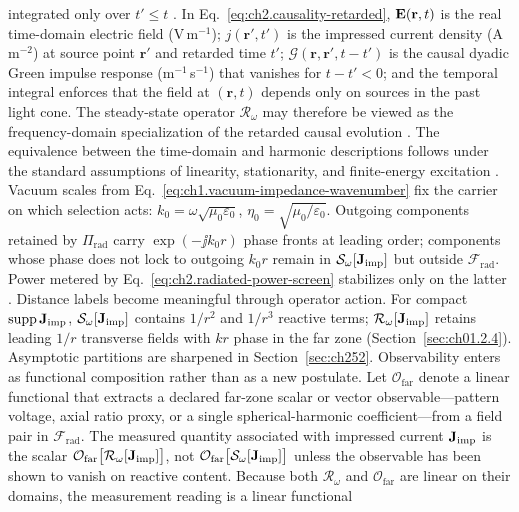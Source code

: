 integrated only over \(t'\le t\) \cite{stratton1941}.
In Eq.~\eqref{eq:ch2.causality-retarded},
\(\mathbf{E}(\mathbf{r},t)\) is the real time-domain electric field (V\,m\(^{-1}\));
\(j(\mathbf{r}',t')\) is the impressed current density (A\,m\(^{-2}\)) at source
point \(\mathbf{r}'\) and retarded time \(t'\);
\(\mathcal{G}(\mathbf{r},\mathbf{r}',t-t')\) is the causal dyadic Green impulse
response (m\(^{-1}\)\,s\(^{-1}\)) that vanishes for \(t-t'<0\); and the temporal
integral enforces that the field at \((\mathbf{r},t)\) depends only on sources in
the past light cone.
The steady-state operator
$\mathcal{R}_\omega$ may therefore be viewed as the frequency-domain specialization of
the retarded causal evolution \cite{stratton1941}. The equivalence between
the time-domain and harmonic descriptions follows under the standard assumptions of
linearity, stationarity, and finite-energy excitation \cite{maxwell1873}.
Vacuum scales from Eq.~\eqref{eq:ch1.vacuum-impedance-wavenumber} fix the carrier
on which selection acts: \(k_0=\omega\sqrt{\mu_0\varepsilon_0}\),
\(\eta_0=\sqrt{\mu_0/\varepsilon_0}\). Outgoing components retained by
\(\Pi_{\mathrm{rad}}\) carry \(\exp(-\jj k_0 r)\) phase fronts at leading order;
components whose phase does not lock to outgoing \(k_0 r\) remain in
\(\mathcal{S}_\omega[\mathbf{J}_{\mathrm{imp}}]\) but outside \(\mathcal{F}_{\mathrm{rad}}\). Power
metered by Eq.~\eqref{eq:ch2.radiated-power-screen} stabilizes only on the latter
\cite{stratton1941}. Distance labels become meaningful through operator action. For compact
\(\operatorname{supp}\mathbf{J}_{\mathrm{imp}}\), \(\mathcal{S}_\omega[\mathbf{J}_{\mathrm{imp}}]\) contains
\(1/r^{2}\) and \(1/r^{3}\) reactive terms; \(\mathcal{R}_\omega[\mathbf{J}_{\mathrm{imp}}]\) retains
leading \(1/r\) transverse fields with \(kr\) phase in the far zone
(Section~\ref{sec:ch01.2.4}). Asymptotic partitions are sharpened in
Section~\ref{sec:ch252}.
Observability enters as functional composition rather than as a new postulate.
Let \(\mathcal{O}_{\mathrm{far}}\) denote a linear functional that extracts a
declared far-zone scalar or vector observable---pattern voltage, axial ratio
proxy, or a single spherical-harmonic coefficient---from a field pair in
\(\mathcal{F}_{\mathrm{rad}}\). The measured quantity associated with impressed current \(\mathbf{J}_{\mathrm{imp}}\) is the scalar
\(\mathcal{O}_{\mathrm{far}}\big[\mathcal{R}_\omega[\mathbf{J}_{\mathrm{imp}}]\big]\), not
\(\mathcal{O}_{\mathrm{far}}\big[\mathcal{S}_\omega[\mathbf{J}_{\mathrm{imp}}]\big]\) unless the
observable has been shown to vanish on reactive content. Because both
\(\mathcal{R}_\omega\) and \(\mathcal{O}_{\mathrm{far}}\) are linear on their
domains, the measurement reading is a linear functional
